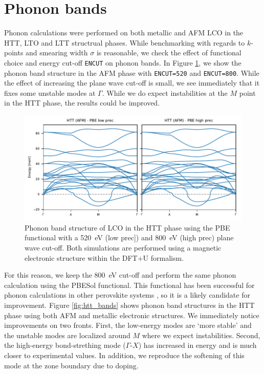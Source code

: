 \section{Phonon bands}
Phonon calculations were performed on both metallic and AFM LCO in the HTT, LTO and LTT structrual phases. While benchmarking with regards to $k$-points and smearing width $\sigma$ is reasonable, we check the effect of functional choice and energy cut-off \texttt{ENCUT} on phonon bands. In Figure \ref{fig:pbe_bands}, we show the phonon band structure in the AFM phase with \texttt{ENCUT=520} and \texttt{ENCUT=800}. While the effect of increasing the plane wave cut-off is small, we see immediately that it fixes some unstable modes at $\Gamma$. While we do expect instabilities at the $M$ point in the HTT phase, the results could be improved.

\begin{figure}
	\centering
	\includegraphics[width=\textwidth]{fig/simulation/htt_pbe_bands.pdf}
	\caption[PBE Bands: Comparison wrt ENCUT]{Phonon band structure of LCO in the HTT phase using the PBE functional with a \SI{520}{\eV} (low prec]) and \SI{800}{\eV} (high prec) plane wave cut-off. Both simulations are performed using a magnetic electronic structure within the DFT+U formalism.}  
	\label{fig:pbe_bands}
\end{figure}

For this reason, we keep the \SI{800}{\eV} cut-off and perform the same phonon calculation using the PBESol \cite{Csonka2009} functional. This functional has been successful for phonon calculations in other perovskite systems \cite{DaSilva2015}, so it is a likely candidate for improvement. Figure \ref{fig:htt_bands} shows phonon band structures in the HTT phase using both AFM and metallic electronic structures. We immediately notice improvements on two fronts. First, the low-energy modes are `more stable' and the unstable modes are localized around $M$ where we expect instabilities. Second, the high-energy bond-strething mode ($\Gamma$-$X$) has increased in energy and is much closer to experimental values. In addition, we reproduce the softening of this mode at the zone boundary due to doping.


